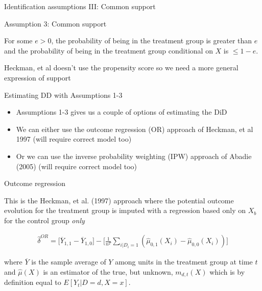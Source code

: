 \documentclass{beamer}
\begin{document}
\begin{frame}{Identification assumptions III: Common support}

Assumption 3: Common support

\bigskip

For some $e>0$, the probability of being in the treatment group is greater than $e$ and the probability of being in the treatment group conditional on $X$ is $\leq1-e$. 

\bigskip

Heckman, et al doesn't use the propensity score so we need a more general expression of support

\end{frame}

\begin{frame}{Estimating DD with Assumptions 1-3}

\begin{itemize}
\item Assumptions 1-3 gives us a couple of options of estimating the DiD
\item We can either use the outcome regression (OR) approach of Heckman, et al 1997 (will require correct model too)
\item Or we can use the inverse probability weighting (IPW) approach of Abadie (2005) (will require correct model too)
\end{itemize}

\end{frame}



\begin{frame}{Outcome regression}

This is the Heckman, et al. (1997) approach where the potential outcome evolution for the treatment group is imputed with a regression based only on $X_b$ for the control group \emph{only}

\bigskip

\begin{eqnarray*}
\widehat{\delta}^{OR} = \bigg [ \overline{Y}_{1,1} -  \overline{Y}_{1,0} \bigg ] -  \bigg [ \frac{1}{n^T} \sum_{i|D_i=1} ( \widehat{\mu}_{0,1}(X_i) - \widehat{\mu}_{0,0}(X_i)) \bigg ]
\end{eqnarray*}

where $\overline{Y}$ is the sample average of $Y$ among units in the treatment group at time $t$ and $\widehat{\mu}(X)$ is an estimator of the true, but unknown, $m_{d,t}(X)$ which is by definition equal to $E[Y_t|D=d,X=x]$.

\end{frame}
\end{document}
